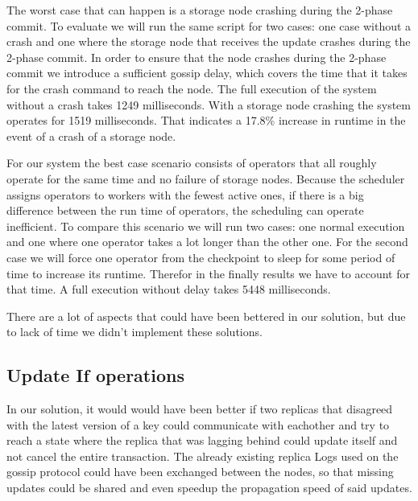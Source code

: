 \documentclass[times, 10pt,twocolumn]{article}
\begin{document}
The worst case that can happen is a storage node crashing during the 2-phase commit.
To evaluate we will run the same script for two cases: one case without a crash and one where the storage node that receives the update crashes during the 2-phase commit.
In order to ensure that the node crashes during the 2-phase commit we introduce a sufficient gossip delay, which covers the time that it takes for the crash command to reach the node.
The full execution of the system without a crash takes 1249 milliseconds.
With a storage node crashing the system operates for 1519 milliseconds.
That indicates a 17.8\% increase in runtime in the event of a crash of a storage node.

For our system the best case scenario consists of operators that all roughly operate for the same time and no failure of storage nodes.
Because the scheduler assigns operators to workers with the fewest active ones, if there is a big difference between the run time of operators, the scheduling can operate inefficient.
To compare this scenario we will run two cases: one normal execution and one where one operator takes a lot longer than the other one.
For the second case we will force one operator from the checkpoint to sleep for some period of time to increase its runtime.
Therefor in the finally results we have to account for that time.
A full execution without delay takes 5448 milliseconds.




There are a lot of aspects that could have been bettered in our solution, but due to lack of time we didn't implement these solutions.

\subsection{Update If operations}

In our solution, it would would have been better if two replicas that disagreed with the latest version of a key could communicate with eachother and try to reach
a state where the replica that was lagging behind could update itself and not cancel the entire transaction. The already existing replica Logs used on the gossip protocol could have been
exchanged between the nodes, so that missing updates could be shared and even speedup the propagation speed of said updates.
\end{document}
